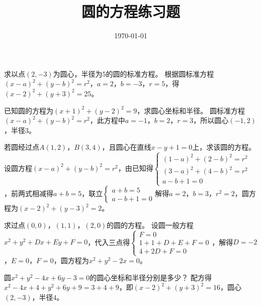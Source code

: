 \documentclass{article}
\title{圆的方程练习题}
\date{\today} %
\begin{document}

\maketitle %

\begin{ExerciseList}
\Exercise
求以点\((2, -3)\)为圆心，半径为\(5\)的圆的标准方程。
\Answer
根据圆标准方程\((x - a)^2+(y - b)^2 = r^2\)，\(a = 2\)，\(b=-3\)，\(r = 5\)，得\((x - 2)^2+(y + 3)^2 = 25\)。

\Exercise
已知圆的方程为\((x + 1)^2+(y - 2)^2 = 9\)，求圆心坐标和半径。
\Answer
圆标准方程\((x - a)^2+(y - b)^2 = r^2\)，此方程中\(a=-1\)，\(b = 2\)，\(r = 3\)，所以圆心\((-1,2)\)，半径\(3\)。

\Exercise
若圆经过点\(A(1,2)\)，\(B(3,4)\)，且圆心在直线\(x - y + 1 = 0\)上，求该圆的方程。
\Answer
设圆方程\((x - a)^2+(y - b)^2 = r^2\)，由已知得\(\begin{cases}(1 - a)^2+(2 - b)^2 = r^2\\(3 - a)^2+(4 - b)^2 = r^2\\a - b+1 = 0\end{cases}\)，前两式相减得\(a + b = 5\)，联立\(\begin{cases}a + b = 5\\a - b+1 = 0\end{cases}\)解得\(a = 2\)，\(b = 3\)，\(r^2 = 2\)，圆方程为\((x - 2)^2+(y - 3)^2 = 2\)。

\Exercise
求过点\((0,0)\)，\((1,1)\)，\((2,0)\)的圆的方程。
\Answer
设圆一般方程\(x^{2}+y^{2}+Dx + Ey+F = 0\)，代入三点得\(\begin{cases}F = 0\\1 + 1+D + E+F = 0\\4+2D+F = 0\end{cases}\)，解得\(D=-2\)，\(E = 0\)，\(F = 0\)，圆方程为\(x^{2}+y^{2}-2x = 0\)。

\Exercise
圆\(x^2 + y^2 - 4x + 6y - 3 = 0\)的圆心坐标和半径分别是多少？
\Answer
配方得\(x^{2}-4x + 4+y^{2}+6y+9=3 + 4+9\)，即\((x - 2)^2+(y + 3)^2 = 16\)，圆心\((2,-3)\)，半径\(4\)。
\end{ExerciseList}
\end{document}
